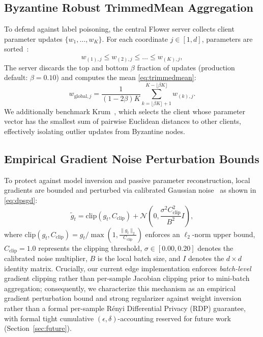\documentclass[journal,10pt,twocolumn]{IEEEtran}
\begin{document}
\subsection{Byzantine Robust TrimmedMean Aggregation}
To defend against label poisoning, the central Flower server collects client parameter updates $\{w_1, \dots, w_K\}$. For each coordinate $j \in [1, d]$, parameters are sorted~\cite{yin2018byzantine}:
\begin{equation}
w_{(1), j} \le w_{(2), j} \le \dots \le w_{(K), j},
\end{equation}
The server discards the top and bottom $\beta$ fraction of updates (production default: $\beta = 0.10$) and computes the mean \eqref{eq:trimmedmean}:
\begin{equation}
w_{\text{global}, j} = \frac{1}{(1 - 2\beta) K} \sum_{k = \lfloor \beta K \rfloor + 1}^{K - \lfloor \beta K \rfloor} w_{(k), j}.
\label{eq:trimmedmean}
\end{equation}
We additionally benchmark Krum~\cite{blanchard2017machine}, which selects the client whose parameter vector has the smallest sum of pairwise Euclidean distances to other clients, effectively isolating outlier updates from Byzantine nodes.

\subsection{Empirical Gradient Noise Perturbation Bounds}
\label{sec:dp_regularization}
To protect against model inversion and passive parameter reconstruction, local gradients are bounded and perturbed via calibrated Gaussian noise~\cite{abadi2016deep} as shown in \eqref{eq:dpsgd}:
\begin{equation}
\tilde{g}_t = \text{clip}(g_t, C_{\text{clip}}) + \mathcal{N}\left(0, \frac{\sigma^2 C_{\text{clip}}^2}{B^2} I\right),
\label{eq:dpsgd}
\end{equation}
where $\text{clip}(g_t, C_{\text{clip}}) = g_t / \max\left(1, \frac{\|g_t\|_2}{C_{\text{clip}}}\right)$ enforces an $\ell_2$-norm upper bound, $C_{\text{clip}} = 1.0$ represents the clipping threshold, $\sigma \in [0.00, 0.20]$ denotes the calibrated noise multiplier, $B$ is the local batch size, and $I$ denotes the $d \times d$ identity matrix. Crucially, our current edge implementation enforces \emph{batch-level} gradient clipping rather than per-sample Jacobian clipping prior to mini-batch aggregation; consequently, we characterize this mechanism as an empirical gradient perturbation bound and strong regularizer against weight inversion rather than a formal per-sample Rényi Differential Privacy (RDP) guarantee, with formal tight cumulative $(\epsilon, \delta)$-accounting reserved for future work (Section~\ref{sec:future}).
\end{document}
